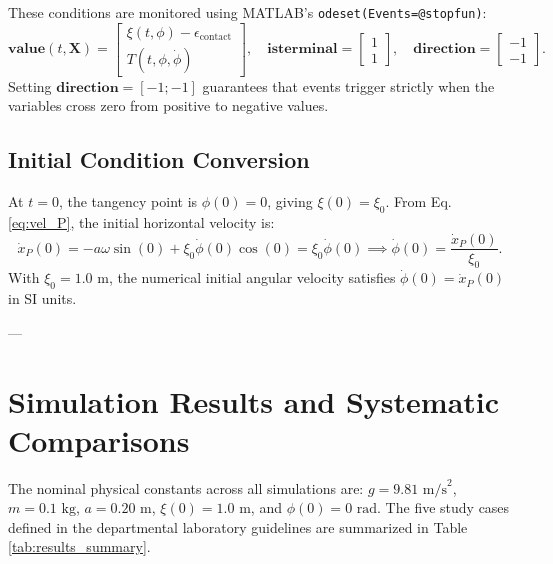 \documentclass[11pt,a4paper]{article}
\begin{document}
These conditions are monitored using MATLAB's \texttt{odeset(Events=@stopfun)}:
\begin{equation}
    \mathbf{value}(t, \mathbf{X}) = \begin{bmatrix} \xi(t, \phi) - \epsilon_{\text{contact}} \\ T(t, \phi, \dot{\phi}) \end{bmatrix}, \quad \mathbf{isterminal} = \begin{bmatrix} 1 \\ 1 \end{bmatrix}, \quad \mathbf{direction} = \begin{bmatrix} -1 \\ -1 \end{bmatrix}.
\end{equation}
Setting $\mathbf{direction} = [-1; -1]$ guarantees that events trigger strictly when the variables cross zero from positive to negative values.

\subsection{Initial Condition Conversion}
At $t = 0$, the tangency point is $\phi(0) = 0$, giving $\xi(0) = \xi_0$. From Eq. \eqref{eq:vel_P}, the initial horizontal velocity is:
\begin{equation}
    \dot{x}_P(0) = -a\omega\sin(0) + \xi_0\dot{\phi}(0)\cos(0) = \xi_0\dot{\phi}(0) \implies \dot{\phi}(0) = \frac{\dot{x}_P(0)}{\xi_0}.
\end{equation}
With $\xi_0 = 1.0\text{ m}$, the numerical initial angular velocity satisfies $\dot{\phi}(0) = \dot{x}_P(0)$ in SI units.

---

\section{Simulation Results and Systematic Comparisons}
\label{sec:results}

The nominal physical constants across all simulations are:
$g = 9.81\text{ m/s}^2$, $m = 0.1\text{ kg}$, $a = 0.20\text{ m}$, $\xi(0) = 1.0\text{ m}$, and $\phi(0) = 0\text{ rad}$. The five study cases defined in the departmental laboratory guidelines are summarized in Table \ref{tab:results_summary}.
\end{document}
